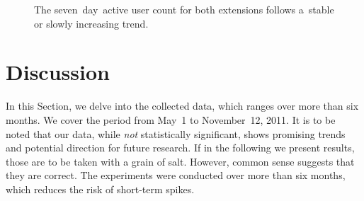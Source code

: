 \documentclass{iosart2c}
\begin{document}
\begin{figure}
  \centering
    \quad
\caption{The seven~day~active user count for both extensions follows a~stable or slowly increasing trend.}
\label{fig:swarmnlpstats}
\end{figure}

\section{Discussion} \label{sec:discussion}
In this Section, we delve into the collected data, which ranges over more than six months.
We cover the period from May~1 to November~12, 2011.
It is to be noted that our data, while \emph{not} statistically significant, shows promising trends and potential direction for future research.
If in the following we present results, those are to be taken with a grain of salt.
However, common sense suggests that they are correct.
The experiments were conducted over more than six months, which reduces the risk of short-term spikes.
\end{document}
